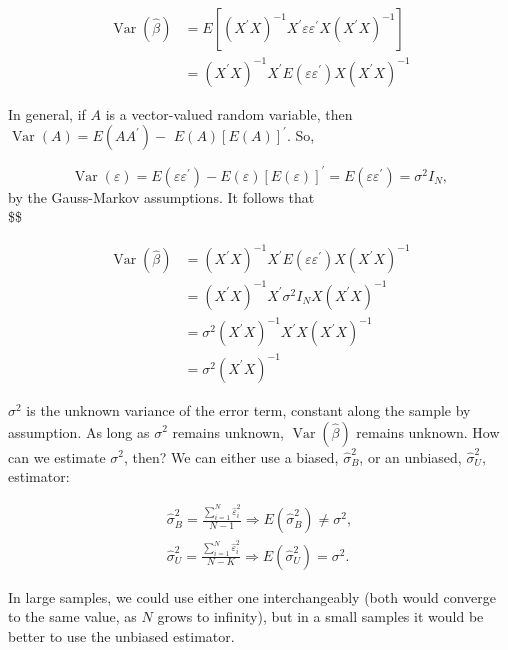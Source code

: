 $$
\begin{aligned}
\operatorname{Var}(\widehat{\beta}) & =E\left[\left(X^{\prime} X\right)^{-1} X^{\prime} \varepsilon \varepsilon^{\prime} X\left(X^{\prime} X\right)^{-1}\right] \\
& =\left(X^{\prime} X\right)^{-1} X^{\prime} E\left(\varepsilon \varepsilon^{\prime}\right) X\left(X^{\prime} X\right)^{-1}
\end{aligned}
$$

In general, if $A$ is a vector-valued random variable, then $\operatorname{Var}(A)=E\left(A A^{\prime}\right)-$ $E(A)[E(A)]^{\prime}$. So,


$$
\operatorname{Var}(\varepsilon)=E\left(\varepsilon \varepsilon^{\prime}\right)-E(\varepsilon)[E(\varepsilon)]^{\prime}=E\left(\varepsilon \varepsilon^{\prime}\right)=\sigma^{2} I_{N},
$$
by the Gauss-Markov assumptions. It follows that\\
\$\$

\[
\begin{aligned}
\operatorname{Var}(\widehat{\beta}) & =\left(X^{\prime} X\right)^{-1} X^{\prime} E\left(\varepsilon \varepsilon^{\prime}\right) X\left(X^{\prime} X\right)^{-1} \\
& =\left(X^{\prime} X\right)^{-1} X^{\prime} \sigma^{2} I_{N} X\left(X^{\prime} X\right)^{-1} \\
& =\sigma^{2}\left(X^{\prime} X\right)^{-1} X^{\prime} X\left(X^{\prime} X\right)^{-1} \\
& =\sigma^{2}\left(X^{\prime} X\right)^{-1}
\end{aligned}
\]

$\sigma^{2}$ is the unknown variance of the error term, constant along the sample by assumption. As long as $\sigma^{2}$ remains unknown, $\operatorname{Var}(\widehat{\beta})$ remains unknown. How can we estimate $\sigma^{2}$, then? We can either use a biased, $\widehat{\sigma}_{B}^{2}$, or an unbiased, $\widehat{\sigma}_{U}^{2}$, estimator:

\[
\begin{gathered}
\widehat{\sigma}_{B}^{2}=\frac{\sum_{i=1}^{N} \widehat{\varepsilon}_{i}^{2}}{N-1} \Longrightarrow E\left(\widehat{\sigma}_{B}^{2}\right) \neq \sigma^{2}, \\
\widehat{\sigma}_{U}^{2}=\frac{\sum_{i=1}^{N} \widehat{\varepsilon}_{i}^{2}}{N-K} \Longrightarrow E\left(\widehat{\sigma}_{U}^{2}\right)=\sigma^{2} .
\end{gathered}
\]

In large samples, we could use either one interchangeably (both would converge to the same value, as $N$ grows to infinity), but in a small samples it would be better to use the unbiased estimator.

